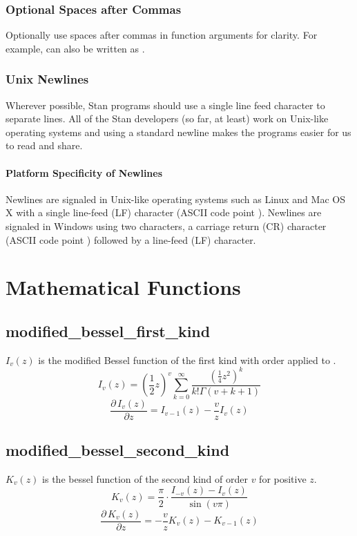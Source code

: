\subsection{Optional Spaces after Commas}

Optionally use spaces after commas in function arguments for clarity.
For example,  can also be
written as .



\subsection{Unix Newlines}

Wherever possible, Stan programs should use a single line feed 
character to separate lines.  All of the Stan developers (so far, at 
least) work on Unix-like operating systems and using a standard 
newline makes the programs easier for us to read and share.  

\subsubsection{Platform Specificity of Newlines}

Newlines are signaled in Unix-like operating systems such as Linux and
Mac OS X with a single line-feed (LF) character (ASCII code point
).  Newlines are signaled in Windows using two characters,
a carriage return (CR) character (ASCII code point )
followed by a line-feed (LF) character.


\chapter{Mathematical Functions}\label{math-functions.appendix}

\section{modified\_bessel\_first\_kind}\label{modified-bessel-first-kind-appendix.section}
$I_v(z)$ is the modified Bessel function of the first kind with order  applied to .
\[
{I_v}(z) = \left(\frac{1}{2}z\right)^v\sum_{k=0}^\infty \frac{\left(\frac{1}{4}z^2\right)^k}{k!\Gamma(v+k+1)}
\]
%
\[
\frac{\partial \, I_v(z)}{\partial z} = I_{v-1}(z)-\frac{v}{z}I_v(z)
\]

\section{modified\_bessel\_second\_kind}\label{modified-bessel-second-kind-appendix.section}
$K_v(z)$ is the bessel function of the second kind of order $v$ for positive $z$.
%
\[
{K_v}(z)
=
\frac{\pi}{2}\cdot\frac{I_{-v}(z) - I_{v}(z)}{\sin(v\pi)}
\]
%
\[
\frac{\partial \, K_v(z)}{\partial z} = -\frac{v}{z}K_v(z)-K_{v-1}(z)
\]

